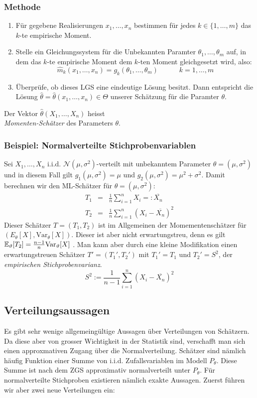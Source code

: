 \subsubsection*{Methode}
\begin{enumerate}
\item Für gegebene Realisierungen $x_1,\dots,x_n$ bestimmen für jedes $k\in\{1,\dots,m\}$ das $k$-te empirische Moment.
\item Stelle ein Gleichungssystem für die Unbekannten Paramter $\theta_1, \dots, \theta_m$ auf, in dem das $k$-te empirische Moment dem $k$-ten Moment gleichgesetzt wird, also:
$$ \widehat{m}_k(x_1,\dots,x_n) = g_k(\theta_1, \dots, \theta_m)\quad \quad \quad k=1,\dots, m$$
\item Überprüfe, ob dieses LGS eine eindeutige Lösung besitzt. Dann entspricht die Lösung $\widehat{\theta}=\widehat{\theta}(x_1,\dots,x_n) \in \Theta$ unserer Schätzung für die Paramter $\theta$.
\end{enumerate}
\begin{definition}
Der Vektor $\widehat{\theta}(X_1,\dots,X_n)$ heisst\\ \textit{Momenten-Schätzer} des Parameters $\theta$.
\end{definition}
\subsubsection*{Beispiel: Normalverteilte Stichprobenvariablen}
Sei $X_1, \dots, X_n$ i.i.d. $\mathcal{N}(\mu, \sigma^2)$-verteilt mit unbekanntem Parameter $\theta = (\mu, \sigma^2)$ und in diesem Fall gilt $g_1(\mu, \sigma^2) = \mu$ und $g_2(\mu, \sigma^2) = \mu^2 + \sigma^2$. Damit berechnen wir den ML-Schätzer für $\theta = (\mu, \sigma^2)$:
\begin{eqnarray*}
T_1 & = & \frac{1}{n}\sum_{i=1}^n X_i =: \overline{X_n} \\
T_2 & = & \frac{1}{n}\sum_{i=1}^n (X_i - \overline{X_n})^2 
\end{eqnarray*}
Dieser Schätzer $T=(T_1,T_2)$ ist im Allgemeinen der Momementenschätzer für  $(E_\theta[X], \mathrm{Var}_\theta [X])$. Dieser ist aber nicht erwartungstreu, denn es gilt $\mathbb{E}_\vartheta[T_2] = \frac{n-1}{n} \mathrm{Var}_\vartheta[X]$ . Man kann aber durch eine kleine Modifikation einen erwartungstreuen Schätzer $T' = (T_1', T_2')$ mit $T_1' = T_1$ und $T_2' = S^2$, der \textit{empirischen Stichprobenvarianz}.
$$ S^2 := \frac{1}{n-1} \sum_{i=1}^n (X_i - \overline{X_n})^2 $$

\subsection{Verteilungsaussagen}
Es gibt sehr wenige allgemeingültige Aussagen über Verteilungen von Schätzern. Da diese aber von grosser Wichtigkeit in der Statistik sind, verschafft man sich einen approxmativen Zugang über die Normalverteilung. Schätzer sind nämlich häufig Funktion einer Summe von i.i.d. Zufallsvariablen im Modell $P_\theta$. Diese Summe ist nach dem ZGS approximativ normalverteilt unter $P_\theta$. Für normalverteilte Stichproben existieren nämlich exakte Aussagen. Zuerst führen wir aber zwei neue Verteilungen ein:

